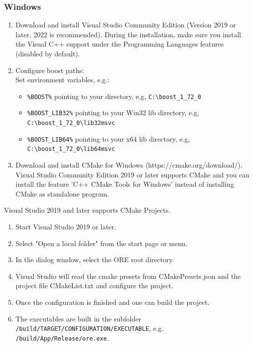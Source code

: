 \documentclass[12pt, a4paper]{article}
\newcommand{\bs}{\textbackslash}
\begin{document}
\subsubsection*{Windows}

\begin{enumerate}

\item Download and install Visual Studio Community Edition (Version 2019 or later, 2022 is recommended). 
During the installation, make sure you install the Visual
C++ support under the Programming Languages features (disabled by default).

\item Configure boost paths: \\

Set environment variables, e.g.:
\begin{itemize}
  	\item  {\tt \%BOOST\%} pointing to your directory, e.g, {\tt C:{\bs}boost\_1\_72\_0} 
  	\item {\tt \%BOOST\_LIB32\%} pointing to your Win32 lib directory, e.g, {\tt C:{\bs}boost\_1\_72\_0{\bs}lib32\-msvc} 
	\item  {\tt \%BOOST\_LIB64\%} pointing to your x64 lib directory, e.g, {\tt C:{\bs}boost\_1\_72\_0{\bs}lib64\-msvc} 
 \end{itemize}
 
\item Download and install CMake for Windows (https://cmake.org/download/). Visual Studio Community Edition 2019 or later supports CMake and you can install the feature 'C++ CMake Tools for Windows' instead of installing CMake as standalone program.

\end{enumerate}


Visual Studio 2019 and later supports CMake Projects.

\begin{enumerate}
\item Start Visual Studio 2019 or later.
\item Select "Open a local folder" from the start page or menu.
\item In the dialog window, select the ORE root directory.
\item Visual Studio will read the cmake presets from CMakePresets.json and the project file CMakeList.txt and configure the project.
\item Once the configuration is finished and one can build the project.
\item The executables are built in the subfolder {\tt /build/TARGET/CONFIGURATION/EXECUTABLE}, e.g. {\tt /build/App/Release/ore.exe}.
\end{enumerate}
\end{document}
